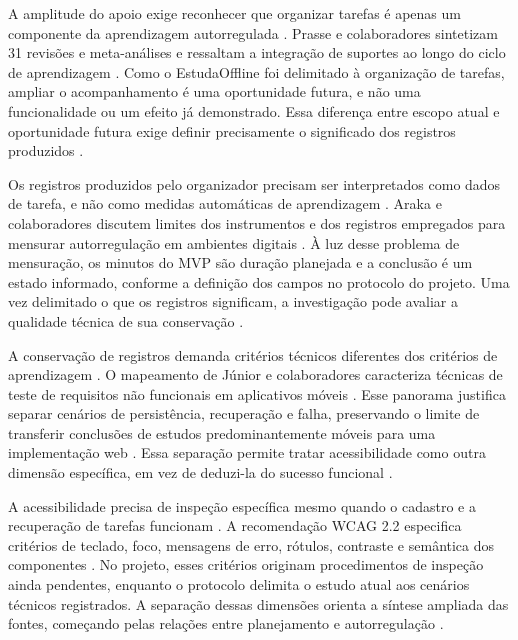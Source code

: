 A amplitude do apoio exige reconhecer que organizar tarefas é apenas um componente da aprendizagem autorregulada \citep[p. 1809, 1825–1827]{education_prasse2024}. Prasse e colaboradores sintetizam 31 revisões e meta-análises e ressaltam a integração de suportes ao longo do ciclo de aprendizagem \citep[p. 1809, 1825–1827]{education_prasse2024}. Como o EstudaOffline foi delimitado à organização de tarefas, ampliar o acompanhamento é uma oportunidade futura, e não uma funcionalidade ou um efeito já demonstrado. Essa diferença entre escopo atual e oportunidade futura exige definir precisamente o significado dos registros produzidos \citep[p. 1809, 1825–1827]{education_prasse2024}.

\newpage

Os registros produzidos pelo organizador precisam ser interpretados como dados de tarefa, e não como medidas automáticas de aprendizagem \citep[p. 4, 15–16]{education_araka2020}. Araka e colaboradores discutem limites dos instrumentos e dos registros empregados para mensurar autorregulação em ambientes digitais \citep[p. 4, 15–16]{education_araka2020}. À luz desse problema de mensuração, os minutos do MVP são duração planejada e a conclusão é um estado informado, conforme a definição dos campos no protocolo do projeto. Uma vez delimitado o que os registros significam, a investigação pode avaliar a qualidade técnica de sua conservação \citep[p. 4, 15–16]{education_araka2020}.

A conservação de registros demanda critérios técnicos diferentes dos critérios de aprendizagem \citep{eng06}. O mapeamento de Júnior e colaboradores caracteriza técnicas de teste de requisitos não funcionais em aplicativos móveis \citep{eng06}. Esse panorama justifica separar cenários de persistência, recuperação e falha, preservando o limite de transferir conclusões de estudos predominantemente móveis para uma implementação web \citep{eng06}. Essa separação permite tratar acessibilidade como outra dimensão específica, em vez de deduzi-la do sucesso funcional \citep{eng06}.

A acessibilidade precisa de inspeção específica mesmo quando o cadastro e a recuperação de tarefas funcionam \citep{wcag}. A recomendação WCAG 2.2 especifica critérios de teclado, foco, mensagens de erro, rótulos, contraste e semântica dos componentes \citep{wcag}. No projeto, esses critérios originam procedimentos de inspeção ainda pendentes, enquanto o protocolo delimita o estudo atual aos cenários técnicos registrados. A separação dessas dimensões orienta a síntese ampliada das fontes, começando pelas relações entre planejamento e autorregulação \citep{wcag}.


